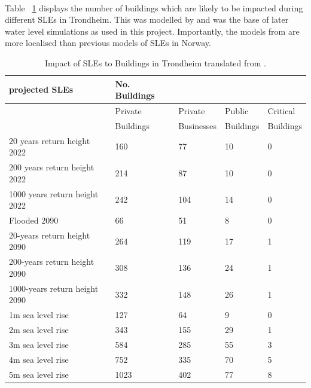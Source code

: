 \paragraph{}
Table ~\ref{table:building-impact-sle} displays the number of buildings which are likely to be impacted during different SLEs in Trondheim. This was modelled by \cite{kartverket_se_2021} and was the base of later water level simulations as used in this project. Importantly, the models from \cite{kartverket_se_2021} are more localised than previous models of SLEs in Norway.

\begin{table}[H]
    \centering
    \begin{tabular}{|l|l|l|l|l|}
    \hline
        \textbf{projected SLEs }& \textbf{No. Buildings}  & ~ & ~ & ~ \\ \hline
        ~ & Private & Private & Public  & Critical  \\ \newline
        ~ & Buildings & Businesses & Buildings & Buildings \\ \hline        
        20 years return height 2022 & 160 & 77 & 10 & 0 \\ \hline
        200 years return height 2022 & 214 & 87 & 10 & 0 \\ \hline
        1000 years return height 2022 & 242 & 104 & 14 & 0 \\ \hline
        Flooded 2090 & 66 & 51 & 8 & 0 \\ \hline
        20-years return height 2090 & 264 & 119 & 17 & 1 \\ \hline
        200-years return height  2090 & 308 & 136 & 24 & 1 \\ \hline
        1000-years return height  2090 & 332 & 148 & 26 & 1 \\ \hline
        1m sea level rise & 127 & 64 & 9 & 0 \\ \hline
        2m sea level rise & 343 & 155 & 29 & 1 \\ \hline
        3m sea level rise & 584 & 285 & 55 & 3 \\ \hline
        4m sea level rise & 752 & 335 & 70 & 5 \\ \hline
        5m sea level rise & 1023 & 402 & 77 & 8 \\ \hline
    \end{tabular}
    \caption{Impact of SLEs to Buildings in Trondheim translated from \cite{kartverket_se_2021}.  }
    \label{table:building-impact-sle}
\end{table}


